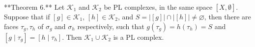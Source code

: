 **Theorem 6.** Let $\mathcal{K}_1$ and $\mathcal{K}_2$ be PL complexes, in the same space $[X, \emptyset]$. Suppose that if $[g] \in \mathcal{K}_1$, $[h] \in \mathcal{K}_2$, and $S = |[g]| \cap |[h]| \neq \varnothing$, then there are faces $\tau_g, \tau_h$ of $\sigma_g$ and $\sigma_h$ respectively, such that $g(\tau_g) = h(\tau_h) = S$ and $[g \mid \tau_g] = [h \mid \tau_h]$. Then $\mathcal{K}_1 \cup \mathcal{K}_2$ is a PL complex.
